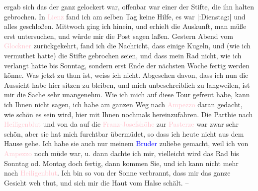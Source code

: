                ergab sich das der \label{K_L03128-3v}\label{K_L03128-3h} ganz gelockert
               war, offenbar war einer der Stifte\textcolor{gray}{,} die ihn halten gebrochen. In \textcolor{pink}{Lienz}{}\ledrightnote{\textcolor{pink}{Lienz}} fand ich am selben Tag
               keine Hilfe, es war |:Dienstag:| \label{K_L03128-4v}\label{K_L03128-4h} und alles geschloßen. Mittwoch ging ich hinein, und erhielt die Auskunft, man
               müße erst untersuchen, und würde mir die Post sagen laßen. Gestern{ }Abend vom \textcolor{pink}{Glockner}{}\ledrightnote{\textcolor{pink}{Großglockner}} zurückgekehrt,
               fand ich die Nachricht, dass einige Kugeln, und (wie ich vermuthet hatte) die Stifte
               gebrochen seien, und dass mein Rad nicht, wie ich {\pb}verlangt hatte bis Sonntag, sondern erst Ende der nächsten Woche fertig
               werden könne. Was jetzt zu thun ist, weiss ich nicht. Abgesehen davon, dass ich nun
               die Aussicht habe hier sitzen zu bleiben, und mich unbeschreiblich zu langweilen, ist
               mir die Sache \label{K_L03128-5v}\label{K_L03128-5h} sehr
               unangenehm. Wie ich mich auf diese Tour gefreut habe, kann ich Ihnen nicht sagen, ich
               habe am ganzen Weg nach \textcolor{pink}{Ampezzo}{}\ledrightnote{\textcolor{pink}{Ampezzo}} daran gedacht,
               wie schön es sein wird, hier mit Ihnen nochmals hereinzufahren. Die Parthie nach \textcolor{pink}{Heiligenblut}{}\ledrightnote{\textcolor{pink}{Heiligenblut am Großglockner}} und von da auf die \textcolor{pink}{Franz-Josefshöhe}{}\ledrightnote{\textcolor{pink}{Kaiser-Franz-Josefs-Höhe}} zur \textcolor{pink}{Pasterze}{}\ledrightnote{\textcolor{pink}{Pasterze Glacier}} war zwar sehr schön, aber sie hat mich furchtbar
               übermüdet, so dass ich heute nicht aus dem Hause gehe.
               Ich habe sie auch nur meinem \textcolor{blue}{Bruder}{}\ledrightnote{{$\rightarrow$}\textcolor{blue}{Michael Emil Salzmann}} zuliebe gemacht, weil ich von \textcolor{pink}{Ampezzo}{}\ledrightnote{\textcolor{pink}{Ampezzo}} noch müde war, u. dann dachte ich mir, vielleicht
               wird das Rad bis Sonntag od. Montag doch fertig, dann kommen Sie, und ich kann nicht mehr nach \textcolor{pink}{Heiligenblut}{}\ledrightnote{\textcolor{pink}{Heiligenblut am Großglockner}}. Ich bin so von der Sonne
               verbrannt, dass mir das ganze Gesicht weh thut, und sich mir die Haut vom Halse
               schält. –\pend
           
